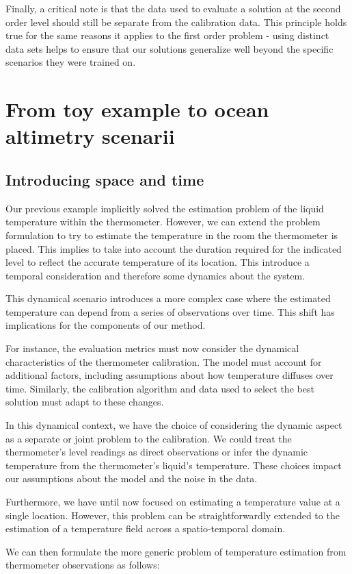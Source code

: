 \begin{bibunit}
Finally, a critical note is that the data used to evaluate a solution at the second order level should still be separate from the calibration data. This principle holds true for the same reasons it applies to the first order problem - using distinct data sets helps to ensure that our solutions generalize well beyond the specific scenarios they were trained on.

\section{From toy example to ocean altimetry scenarii}
\subsection{Introducing space and time}
Our previous example implicitly solved the estimation problem of the liquid temperature  within the thermometer. However, we can extend the problem formulation to try to estimate the temperature in the room the thermometer is placed. This implies to take into account the duration required for the indicated level to reflect the accurate temperature of its location. This introduce a temporal consideration and therefore some dynamics about the system.

This dynamical scenario introduces a more complex case where the estimated temperature can depend from a series of observations over time. This shift has implications for the components of our method.

For instance, the evaluation metrics must now consider the dynamical characteristics of the thermometer calibration. The model must account for additional factors, including assumptions about how temperature diffuses over time. Similarly, the calibration algorithm and data used to select the best solution must adapt to these changes.

In this dynamical context, we have the choice of considering the dynamic aspect as a separate or joint problem to the calibration. We could treat the thermometer's level readings as direct observations or infer the dynamic temperature from the thermometer's liquid's temperature. These choices impact our assumptions about the model and the noise in the data.

Furthermore, we have until now focused on estimating a temperature value at a single location. However, this problem can be straightforwardly extended to the estimation of a temperature field across a spatio-temporal domain.

We can then formulate the more generic problem of temperature estimation from thermometer observations as follows:


\end{bibunit}
